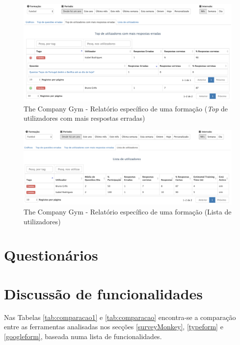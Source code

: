 \begin{figure}[ht!]
	\begin{center}
		\includegraphics[width=1\textwidth]{img/tcg/tcg-data-f2.png}
		\caption{The Company Gym - Relatório específico de uma formação (\textit{Top} de utilizadores com mais respostas erradas)}
		\label{fig:tcg-data-f2}
	\end{center}
\end{figure}

\begin{figure}[ht!]
	\begin{center}
		\includegraphics[width=1\textwidth]{img/tcg/tcg-data-f3.png}
		\caption{The Company Gym - Relatório específico de uma formação (Lista de utilizadores)}
		\label{fig:tcg-data-f3}
	\end{center}
\end{figure}

\newpage


\section{Questionários}


\section{Discussão de funcionalidades}
\label{comparacao}

Nas Tabelas \ref{tab:comparacao1} e \ref{tab:comparacao} encontra-se a comparação entre as ferramentas analisadas nos secções \ref{surveyMonkey}, \ref{typeform} e \ref{googleform}, baseada numa lista de funcionalidades.

